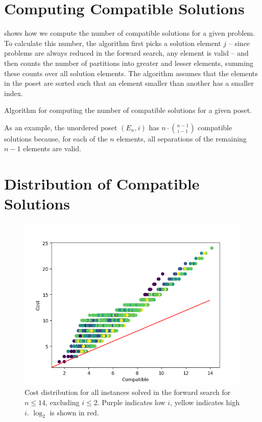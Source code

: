 \documentclass[a4paper,UKenglish,cleveref, autoref, thm-restate, anonymous]{lipics-v2021}
\begin{document}
\section{Computing Compatible Solutions}
 shows how we compute the number of compatible solutions for a given problem.
To calculate this number, the algorithm first picks a solution element $j$ -- since problems are always reduced in the forward search, any element is valid -- and then counts the number of partitions into greater and lesser elements, summing these counts over all solution elements.
The algorithm assumes that the elements in the poset are sorted such that an element smaller than another has a smaller index.

\begin{algorithm}[t]
  \centering
  
  \caption{Algorithm for computing the number of compatible solutions for a given poset.}
  \label{algo:compatible_solutions}
\end{algorithm}

As an example, the unordered poset $(E_n, i)$ has $n \cdot \binom{n - 1}{i - 1}$ compatible solutions because, for each of the $n$ elements, all separations of the remaining $n - 1$ elements are valid.


\section{Distribution of Compatible Solutions}%
\begin{figure}[h]
  \includegraphics*[scale=0.5]{figures/compatible_cost_relation}
  \caption*{Cost distribution for all instances solved in the forward search for $n \leq 14$, excluding $i \leq 2$.
    Purple indicates low $i$, yellow indicates high $i$. $\log_2$ is shown in red.}
\end{figure}
\end{document}
